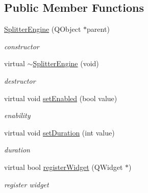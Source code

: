 \subsection*{Public Member Functions}
\begin{DoxyCompactItemize}
\item 
\mbox{\label{class_splitter_engine_aa23efcc96c9228bae019554ce7fccbf3}} 
\hyperlink{class_splitter_engine_aa23efcc96c9228bae019554ce7fccbf3}{Splitter\+Engine} (Q\+Object $\ast$parent)
\begin{DoxyCompactList}\small\item\em constructor \end{DoxyCompactList}\item 
\mbox{\label{class_splitter_engine_a8340e86edfcea3b79d03aae65fe4e945}} 
virtual \hyperlink{class_splitter_engine_a8340e86edfcea3b79d03aae65fe4e945}{$\sim$\+Splitter\+Engine} (void)
\begin{DoxyCompactList}\small\item\em destructor \end{DoxyCompactList}\item 
\mbox{\label{class_splitter_engine_acc37e626df8ce98ef5ef9c656d81cef2}} 
virtual void \hyperlink{class_splitter_engine_acc37e626df8ce98ef5ef9c656d81cef2}{set\+Enabled} (bool value)
\begin{DoxyCompactList}\small\item\em enability \end{DoxyCompactList}\item 
\mbox{\label{class_splitter_engine_a0299cf094247abc18b874ba4cf172165}} 
virtual void \hyperlink{class_splitter_engine_a0299cf094247abc18b874ba4cf172165}{set\+Duration} (int value)
\begin{DoxyCompactList}\small\item\em duration \end{DoxyCompactList}\item 
\mbox{\label{class_splitter_engine_a57e56d3f66e3b634966ce1c1cc06e685}} 
virtual bool \hyperlink{class_splitter_engine_a57e56d3f66e3b634966ce1c1cc06e685}{register\+Widget} (Q\+Widget $\ast$)
\begin{DoxyCompactList}\small\item\em register widget \end{DoxyCompactList}\item 

\end{DoxyCompactItemize}
